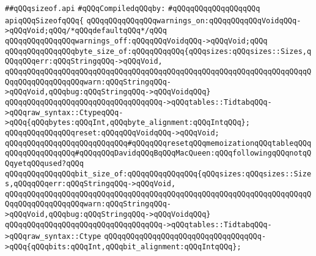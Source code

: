 \label{src/lib/c-kit/src/ast/sizeof.api}
\verb|##qQQqsizeof.api|\newline
\newline
\verb|#qQQqCompiledqQQqby:|\newline
\verb|#qQQqqQQqqQQqqQQqqQQq|\newline
\newline
\verb|apiqQQqSizeofqQQq{|\newline
\newline
\verb|qQQqqQQqqQQqqQQqwarnings_on:qQQqqQQqqQQqVoidqQQq->qQQqVoid;qQQq/*qQQqdefaultqQQq*/qQQq|\newline
\verb|qQQqqQQqqQQqqQQqwarnings_off:qQQqqQQqVoidqQQq->qQQqVoid;qQQq|\newline
\verb|qQQqqQQqqQQqqQQqbyte_size_of:qQQqqQQqqQQq{qQQqsizes:qQQqsizes::Sizes,qQQqqQQqerr:qQQqStringqQQq->qQQqVoid,|\newline
\verb|qQQqqQQqqQQqqQQqqQQqqQQqqQQqqQQqqQQqqQQqqQQqqQQqqQQqqQQqqQQqqQQqqQQqqQQqqQQqqQQqqQQqqQQqwarn:qQQqStringqQQq->qQQqVoid,qQQqbug:qQQqStringqQQq->qQQqVoidqQQq}|\newline
\verb|qQQqqQQqqQQqqQQqqQQqqQQqqQQqqQQqqQQq->qQQqtables::TidtabqQQq->qQQqraw_syntax::CtypeqQQq->qQQq{qQQqbytes:qQQqInt,qQQqbyte_alignment:qQQqIntqQQq};|\newline
\newline
\verb|qQQqqQQqqQQqqQQqreset:qQQqqQQqVoidqQQq->qQQqVoid;|\newline
\verb|qQQqqQQqqQQqqQQqqQQqqQQqqQQq#qQQqqQQqresetqQQqmemoizationqQQqtableqQQq|\newline
\newline
\verb|qQQqqQQqqQQqqQQq#qQQqqQQqDavidqQQqBqQQqMacQueen:qQQqfollowingqQQqnotqQQqyetqQQqused?qQQq|\newline
\newline
\verb|qQQqqQQqqQQqqQQqbit_size_of:qQQqqQQqqQQqqQQq{qQQqsizes:qQQqsizes::Sizes,qQQqqQQqerr:qQQqStringqQQq->qQQqVoid,|\newline
\verb|qQQqqQQqqQQqqQQqqQQqqQQqqQQqqQQqqQQqqQQqqQQqqQQqqQQqqQQqqQQqqQQqqQQqqQQqqQQqqQQqqQQqqQQqwarn:qQQqStringqQQq->qQQqVoid,qQQqbug:qQQqStringqQQq->qQQqVoidqQQq}|\newline
\verb|qQQqqQQqqQQqqQQqqQQqqQQqqQQqqQQqqQQq->qQQqtables::TidtabqQQq->qQQqraw_syntax::Ctype|\newline
\verb|qQQqqQQqqQQqqQQqqQQqqQQqqQQqqQQqqQQq->qQQq{qQQqbits:qQQqInt,qQQqbit_alignment:qQQqIntqQQq};|\newline
\newline
